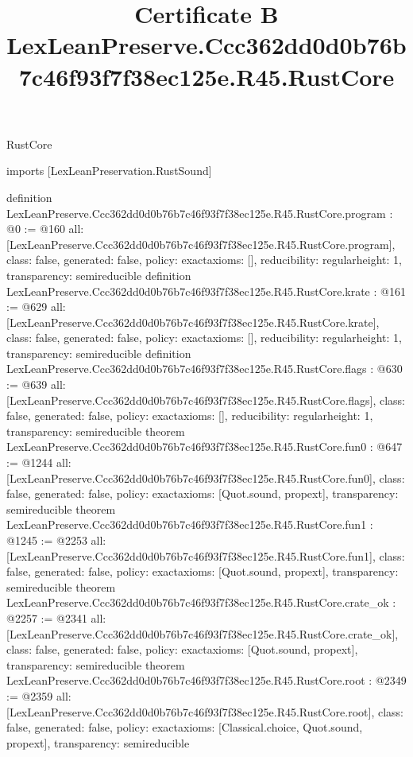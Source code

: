\begin{lexlean}{RustCore}
\title{Certificate B LexLeanPreserve.Ccc362dd0d0b76b7c46f93f7f38ec125e.R45.RustCore}
\begin{coremodule}
imports [LexLeanPreservation.RustSound]

definition LexLeanPreserve.Ccc362dd0d0b76b7c46f93f7f38ec125e.R45.RustCore.program : @0 := @160 {
  all: [LexLeanPreserve.Ccc362dd0d0b76b7c46f93f7f38ec125e.R45.RustCore.program],
  class: false,
  generated: false,
  policy: exact{axioms: []},
  reducibility: regular{height: 1},
  transparency: semireducible
}
definition LexLeanPreserve.Ccc362dd0d0b76b7c46f93f7f38ec125e.R45.RustCore.krate : @161 := @629 {
  all: [LexLeanPreserve.Ccc362dd0d0b76b7c46f93f7f38ec125e.R45.RustCore.krate],
  class: false,
  generated: false,
  policy: exact{axioms: []},
  reducibility: regular{height: 1},
  transparency: semireducible
}
definition LexLeanPreserve.Ccc362dd0d0b76b7c46f93f7f38ec125e.R45.RustCore.flags : @630 := @639 {
  all: [LexLeanPreserve.Ccc362dd0d0b76b7c46f93f7f38ec125e.R45.RustCore.flags],
  class: false,
  generated: false,
  policy: exact{axioms: []},
  reducibility: regular{height: 1},
  transparency: semireducible
}
theorem LexLeanPreserve.Ccc362dd0d0b76b7c46f93f7f38ec125e.R45.RustCore.fun0 : @647 := @1244 {
  all: [LexLeanPreserve.Ccc362dd0d0b76b7c46f93f7f38ec125e.R45.RustCore.fun0],
  class: false,
  generated: false,
  policy: exact{axioms: [Quot.sound, propext]},
  transparency: semireducible
}
theorem LexLeanPreserve.Ccc362dd0d0b76b7c46f93f7f38ec125e.R45.RustCore.fun1 : @1245 := @2253 {
  all: [LexLeanPreserve.Ccc362dd0d0b76b7c46f93f7f38ec125e.R45.RustCore.fun1],
  class: false,
  generated: false,
  policy: exact{axioms: [Quot.sound, propext]},
  transparency: semireducible
}
theorem LexLeanPreserve.Ccc362dd0d0b76b7c46f93f7f38ec125e.R45.RustCore.crate_ok : @2257 := @2341 {
  all: [LexLeanPreserve.Ccc362dd0d0b76b7c46f93f7f38ec125e.R45.RustCore.crate_ok],
  class: false,
  generated: false,
  policy: exact{axioms: [Quot.sound, propext]},
  transparency: semireducible
}
theorem LexLeanPreserve.Ccc362dd0d0b76b7c46f93f7f38ec125e.R45.RustCore.root : @2349 := @2359 {
  all: [LexLeanPreserve.Ccc362dd0d0b76b7c46f93f7f38ec125e.R45.RustCore.root],
  class: false,
  generated: false,
  policy: exact{axioms: [Classical.choice, Quot.sound, propext]},
  transparency: semireducible
}


\end{coremodule}
\end{lexlean}
